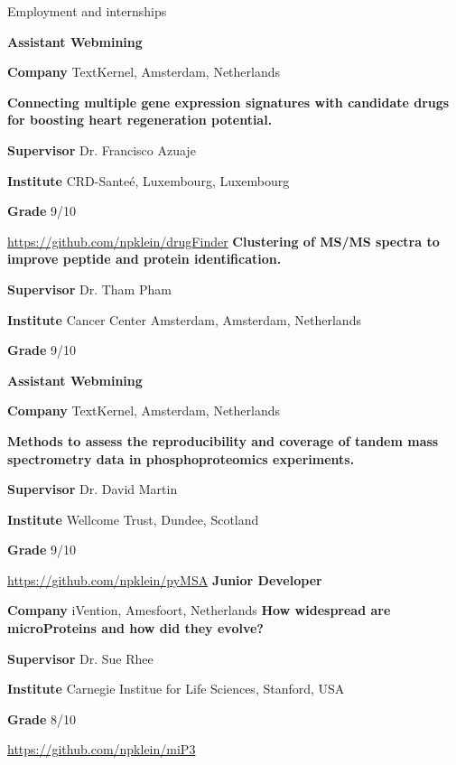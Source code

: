 \begin{rubric}{Employment and internships}
%
%


%
\textbf{Assistant Webmining} \par
\textbf{Company} TextKernel, Amsterdam, Netherlands

%
\textbf{Connecting multiple gene expression signatures with candidate drugs for boosting heart regeneration potential.} \par
\textbf{Supervisor} Dr. Francisco Azuaje \par
\textbf{Institute} CRD-Sante\'e, Luxembourg, Luxembourg \par
\textbf{Grade} 9/10 \par
\url{https://github.com/npklein/drugFinder}
%
%
\textbf{Clustering of MS/MS spectra to improve peptide and protein identification.} \par
\textbf{Supervisor} Dr. Tham Pham \par
\textbf{Institute} Cancer Center Amsterdam, Amsterdam, Netherlands\par
\textbf{Grade} 9/10 \par
%
%
\textbf{Assistant Webmining} \par
\textbf{Company} TextKernel, Amsterdam, Netherlands

%


%
\textbf{Methods to assess the reproducibility and coverage of tandem mass spectrometry data in phosphoproteomics experiments.} \par
\textbf{Supervisor} Dr. David Martin \par
\textbf{Institute} Wellcome Trust, Dundee, Scotland \par
\textbf{Grade} 9/10 \par
\url{https://github.com/npklein/pyMSA}
%
%
\textbf{Junior Developer} \par
\textbf{Company} iVention, Amesfoort, Netherlands
%
%
\textbf{How widespread are microProteins and how did they evolve?} \par
\textbf{Supervisor} Dr. Sue Rhee \par
\textbf{Institute} Carnegie Institue for Life Sciences, Stanford, USA \par
\textbf{Grade} 8/10 \par
\url{https://github.com/npklein/miP3}


\end{rubric}